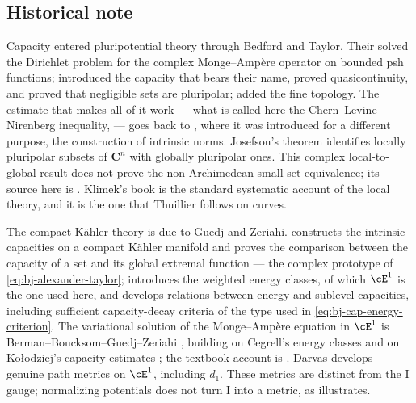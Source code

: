 \subsection{Historical note}
\label{sec:ch48-history}

Capacity entered pluripotential theory through Bedford and Taylor.  Their
\cite{BT76} solved the Dirichlet problem for the complex Monge--Amp\`ere
operator on bounded psh functions; \cite{BT82} introduced the capacity that
bears their name, proved quasicontinuity, and proved that negligible sets
are pluripolar; \cite{BT87} added the fine topology.  The estimate that
makes all of it work --- what is called here the Chern--Levine--Nirenberg
inequality,  --- goes back to \cite{CLN69}, where it was
introduced for a different purpose, the construction of intrinsic norms.
Josefson's theorem \cite{Jos78} identifies locally pluripolar subsets of
$\mathbf C^n$ with globally pluripolar ones. This complex local-to-global
result does not prove the non-Archimedean small-set equivalence;
its source here is \cite[Theorems~13.14 and 13.17]{BJ22}. Klimek's book
\cite{Kl91} is the standard systematic account of the local theory, and it
is the one that Thuillier follows on curves.

The compact Kähler theory is due to Guedj and Zeriahi.  \cite{GZ05}
constructs the intrinsic capacities on a compact Kähler manifold and proves
the comparison between the capacity of a set and its global extremal
function --- the complex prototype of
\eqref{eq:bj-alexander-taylor}; \cite{GZ07} introduces the weighted energy
classes, of which $\cE^1$ is the one used here, and develops
relations between energy and sublevel capacities, including sufficient
capacity-decay criteria of the type used in
\eqref{eq:bj-cap-energy-criterion}.  The variational solution of the
Monge--Amp\`ere equation in $\cE^1$ is
Berman--Boucksom--Guedj--Zeriahi \cite{BBGZ13}, building on Cegrell's
energy classes \cite{Ceg98} and on Ko\l{}odziej's capacity estimates
\cite{Kol98}; the textbook account is \cite{GZ17}.  Darvas \cite{Dar15,Dar17} develops genuine path metrics on
$\cE^1$, including $d_1$. These metrics are distinct from the
I gauge; normalizing potentials does not turn I into a metric, as
 illustrates.

